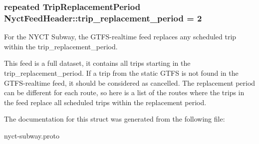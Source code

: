 \subsubsection[{\texorpdfstring{trip\+\_\+replacement\+\_\+period}{trip_replacement_period}}]{\setlength{\rightskip}{0pt plus 5cm}repeated {\bf Trip\+Replacement\+Period} Nyct\+Feed\+Header\+::trip\+\_\+replacement\+\_\+period = 2}\hypertarget{structNyctFeedHeader_a941bcc94efc50c96134a7702185bd509}{}\label{structNyctFeedHeader_a941bcc94efc50c96134a7702185bd509}


For the N\+Y\+CT Subway, the G\+T\+F\+S-\/realtime feed replaces any scheduled trip within the trip\+\_\+replacement\+\_\+period. 

This feed is a full dataset, it contains all trips starting in the trip\+\_\+replacement\+\_\+period. If a trip from the static G\+T\+FS is not found in the G\+T\+F\+S-\/realtime feed, it should be considered as cancelled. The replacement period can be different for each route, so here is a list of the routes where the trips in the feed replace all scheduled trips within the replacement period. 

The documentation for this struct was generated from the following file\+:\begin{DoxyCompactItemize}
\item 
nyct-\/subway.\+proto\end{DoxyCompactItemize}
